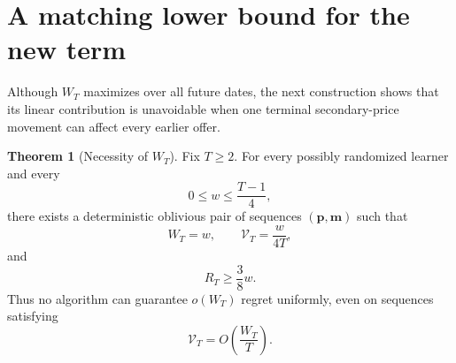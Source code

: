 \documentclass[11pt]{article}
\theoremstyle{definition}
\newtheorem{theorem}{Theorem}
\begin{document}
\section{A matching lower bound for the new term}
\label{sec:a-matching-lower-bound-for-the-new-term}

Although $W_T$ maximizes over all future dates, the next construction
shows that its linear contribution is unavoidable when one terminal
secondary-price movement can affect every earlier offer.

\begin{theorem}[Necessity of $W_T$]
\label{thm:necessity-w}
Fix $T \ge 2$. For every possibly randomized learner and every
\[
    0 \le w \le \frac{T-1}{4},
\]
there exists a deterministic oblivious pair of sequences
$(\boldsymbol{p},\boldsymbol{m})$ such that
\[
    W_T=w,
    \qquad
    \mathcal{V}_T=\frac{w}{4T},
\]
and
\[
    R_T\ge\frac{3}{8}w.
\]
Thus no algorithm can guarantee $o(W_T)$ regret uniformly, even on
sequences satisfying
\[
    \mathcal{V}_T=O\left(\frac{W_T}{T}\right).
\]
\end{theorem}
\end{document}
